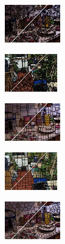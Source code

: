 \begin{figure}
	\begin{subfigure}[b]{0.1375\textwidth}
		\includegraphics[height=1.65cm]{pictures/nyuv2/seeds/cropped/seeds_00000561_contours}
	\end{subfigure}
	\begin{subfigure}[b]{0.129\textwidth}
		\includegraphics[height=1.65cm]{pictures/sunrgbd/seeds/cropped/seeds_00004732_contours}
	\end{subfigure}
	\begin{subfigure}[b]{0.02\textwidth}
	\end{subfigure}
	\begin{subfigure}[b]{0.1375\textwidth}
		\includegraphics[height=1.65cm]{pictures/nyuv2/tps/cropped/tps_00000561_contours}
	\end{subfigure}
	\begin{subfigure}[b]{0.129\textwidth}
		\includegraphics[height=1.65cm]{pictures/sunrgbd/tps/cropped/tps_00004732_contours}
	\end{subfigure}
	\begin{subfigure}[b]{0.02\textwidth}
	\end{subfigure}
	\begin{subfigure}[b]{0.1375\textwidth}
		\includegraphics[height=1.65cm]{pictures/nyuv2/vc/cropped/vc_00000561_contours}

\end{subfigure}
\end{figure}
